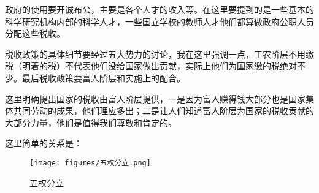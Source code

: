 \documentclass[11pt,oneside]{article}
\begin{document}
政府的使用要开诚布公，主要是各个人才的收入等。在这里要提到的是一些基本的科学研究机构内部的科学人才，一些国立学校的教师人才他们都算做政府公职人员分配这些税收。

税收政策的具体细节要经过五大势力的讨论，我在这里强调一点，工农阶层不用缴税（明着的税）不代表他们没给国家做出贡献，实际上他们为国家缴的税绝对不少。最后税收政策要富人阶层和实施上的配合。

这里明确提出国家的税收由富人阶层提供，一是因为富人赚得钱大部分也是国家集体共同劳动的成果，他们理应多出；二是让人们知道富人阶层为国家的税收贡献的大部分力量，他们是值得我们尊敬和肯定的。

这里简单的关系是：

\begin{figure}[H]
\centering
\texttt{[image: figures/五权分立.png]}
\caption{五权分立}
\end{figure}
\end{document}
